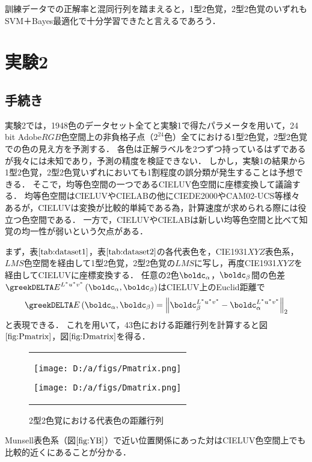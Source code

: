\documentclass[uplatex,paper=a4,fontsize=4.0truemm,jafontsize=4.0truemm,head_space=30.0truemm,baselineskip=8.0truemm,gutter=25.0truemm,oneside,fleqn,hanging_panctuation,open_bracket_pos=nibu_tentsuki,dvipdfmx,jis2004,book,titlepage]{jlreq}
\theoremstyle{mystyle}
\newcommand{\mathdisplaystyle}[1]{\(\displaystyle{#1}\)}
\newcommand{\Reference}[1]{\mathdisplaystyle{\ref{#1}}}
\newcommand{\parentheses}[1]{\left(#1\right)}
\newcommand{\norm}[2]{{\left\lVert#1\right\rVert}_{#2}}
\begin{document}
				訓練データでの正解率と混同行列を踏まえると，1型2色覚，2型2色覚のいずれもSVM＋Bayes最適化で十分学習できたと言えるであろう．
		\section{実験2}
			\subsection{手続き}
				実験2では，1948色のデータセット全てと実験1で得たパラメータを用いて，24 bit Adobe\mathdisplaystyle{RGB}色空間上の非負格子点（\mathdisplaystyle{2^{24}}色）全てにおける1型2色覚，2型2色覚での色の見え方を予測する．
				各色は正解ラベルを2つずつ持っているはずであるが我々には未知であり，予測の精度を検証できない．
				しかし，実験1の結果から1型2色覚，2型2色覚いずれにおいても1割程度の誤分類が発生することは予想できる．
				そこで，均等色空間の一つであるCIELUV色空間に座標変換して議論する．
				均等色空間はCIELUVやCIELABの他にCIEDE2000やCAM02-UCS等様々ある\cite{Yaguchi2017b}が，CIELUVは変換が比較的単純である為，計算速度が求められる際には役立つ色空間である．
				一方で，CIELUVやCIELABは新しい均等色空間と比べて知覚の均一性が弱いという欠点がある\cite[p.~10]{Robertson1977}．

				まず，表\Reference{tab:dataset1}，表\Reference{tab:dataset2}の各代表色を，CIE1931\mathdisplaystyle{XYZ}表色系，\mathdisplaystyle{LMS}色空間を経由して1型2色覚，2型2色覚の\mathdisplaystyle{LMS}に写し，再度CIE1931\mathdisplaystyle{XYZ}を経由してCIELUVに座標変換する．
				任意の2色\mathdisplaystyle{\boldc_\alpha}，\mathdisplaystyle{\boldc_\beta}間の色差\mathdisplaystyle{\greekDELTA E^{L^\ast u^\ast v^\ast}\parentheses{\boldc_\alpha,\boldc_\beta}}はCIELUV上のEuclid距離で
				\begin{equation*}
					\greekDELTA E\parentheses{\boldc_\alpha,\boldc_\beta}=\norm{\boldc_\beta^{L^\ast u^\ast v^\ast}-\boldc_\alpha^{L^\ast u^\ast v^\ast}}{2}
				\end{equation*}
				と表現できる．
				これを用いて，43色における距離行列を計算すると図\Reference{fig:Pmatrix}，図\Reference{fig:Dmatrix}を得る．
				\begin{figure}[tbp]
					\centering
					\begin{tabular}{c}
						\begin{minipage}{0.4\hsize}
							\centering
							\texttt{[image: D:/a/figs/Pmatrix.png]}\caption{1型2色覚における代表色の距離行列}\label{fig:Pmatrix}
						\end{minipage}
						\begin{minipage}{0.1\hsize}
							\vspace{1truemm}
						\end{minipage}
						\begin{minipage}{0.4\hsize}
							\centering
							\texttt{[image: D:/a/figs/Dmatrix.png]}\caption{2型2色覚における代表色の距離行列}\label{fig:Dmatrix}
						\end{minipage}
					\end{tabular}
				\end{figure}
				Munsell表色系（図\Reference{fig:YB}）で近い位置関係にあった対はCIELUV色空間上でも比較的近くにあることが分かる．
\end{document}
